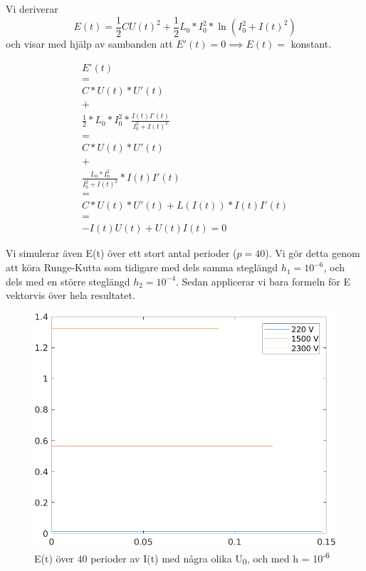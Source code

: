 \documentclass[a4paper, titlepage, 11pt]{article}
\begin{document}
Vi deriverar
$$E(t) = \frac{1}{2}CU(t)^2 + \frac{1}{2}L_0*I_0^2*\ln(I_0^2 + I(t)^2)$$
och visar med hjälp av sambanden att $E'(t) = 0 \implies E(t) =$ konstant.

\begin{gather*}
    E'(t) \\ = \\
    C*U(t)*U'(t) \\
    + \\
    \frac{1}{2}*L_0*I_0^2 * \frac{I(t)I'(t)}{I_0^2 + I(t)^2} \\
    = \\
    C*U(t)*U'(t) \\
    + \\
    \frac{L_0*I_0^2}{I_0^2 + I(t)^2}*I(t)I'(t) \\
    = \\
    C*U(t)*U'(t) + L(I(t)) * I(t)I'(t) \\
    = \\
    -I(t)U(t) + U(t)I(t) = 0
\end{gather*}

Vi simulerar även E(t) över ett stort antal perioder ($p = 40$). Vi gör detta genom att köra Runge-Kutta som tidigare med dels samma steglängd $h_1 = 10^{-6}$, och dels med en större steglängd $h_2 = 10^{-4}$. Sedan applicerar vi bara formeln för E vektorvis över hela resultatet.

\begin{figure}[H]
  \includegraphics[width=\linewidth]{E-smallH.png}
  \caption{E(t) över 40 perioder av I(t) med några olika U\textsubscript{0}, och med h = 10\textsuperscript{-6}}
\end{figure}
\end{document}
